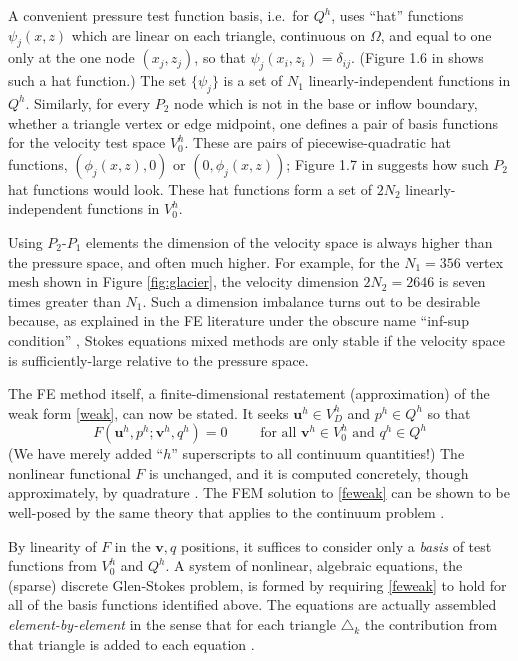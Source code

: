 \documentclass[letterpaper,final,12pt,reqno]{amsart}
\newcommand{\bu}{\mathbf{u}}
\newcommand{\bv}{\mathbf{v}}
\begin{document}
A convenient pressure test function basis, i.e.~for $Q^h$, uses ``hat'' functions $\psi_j(x,z)$ which are linear on each triangle, continuous on $\Omega$, and equal to one only at the one node $(x_j,z_j)$, so that $\psi_j(x_i,z_i) = \delta_{ij}$.  (Figure 1.6 in \cite{Elmanetal2014} shows such a hat function.)  The set $\{\psi_j\}$ is a set of $N_1$ linearly-independent functions in $Q^h$.  Similarly, for every $P_2$ node which is not in the base or inflow boundary, whether a triangle vertex or edge midpoint, one defines a pair of basis functions for the velocity test space $V_0^h$.  These are pairs of piecewise-quadratic hat functions, $(\phi_j(x,z),0)$ or $(0,\phi_j(x,z))$; Figure 1.7 in \cite{Elmanetal2014} suggests how such $P_2$ hat functions would look.  These hat functions form a set of $2N_2$ linearly-independent functions in $V_0^h$.

Using $P_2$-$P_1$ elements the dimension of the velocity space is always higher than the pressure space, and often much higher.  For example, for the $N_1=356$ vertex mesh shown in Figure \ref{fig:glacier}, the velocity dimension $2N_2=2646$ is seven times greater than $N_1$.  Such a dimension imbalance turns out to be desirable because, as explained in the FE literature under the obscure name ``inf-sup condition'' \cite{Braess2007,Bueler2021,Elmanetal2014}, Stokes equations mixed methods are only stable if the velocity space is sufficiently-large relative to the pressure space.

The FE method itself, a finite-dimensional restatement (approximation) of the weak form \eqref{weak}, can now be stated.  It seeks $\bu^h \in V_D^h$ and $p^h \in Q^h$ so that
\begin{equation}
F(\bu^h,p^h;\bv^h,q^h) = 0 \qquad \text{ for all } \bv^h\in V_0^h \text{ and } q^h\in Q^h  \label{feweak}
\end{equation}
(We have merely added ``$h$'' superscripts to all continuum quantities!)  The nonlinear functional $F$ is unchanged, and it is computed concretely, though approximately, by quadrature \cite{Bueler2021,Elmanetal2014}.  The FEM solution to \eqref{feweak} can be shown to be well-posed by the same theory that applies to the continuum problem \cite[Theorem 4.3]{JouvetRappaz2011}.

By linearity of $F$ in the $\bv,q$ positions, it suffices to consider only a \emph{basis} of test functions from $V_0^h$ and $Q^h$.  A system of nonlinear, algebraic equations, the (sparse) discrete Glen-Stokes problem, is formed by requiring \eqref{feweak} to hold for all of the basis functions identified above.  The equations are actually assembled \emph{element-by-element} in the sense that for each triangle $\triangle_k$ the contribution from that triangle is added to each equation \cite[Chapter 10]{Bueler2021}.
\end{document}
